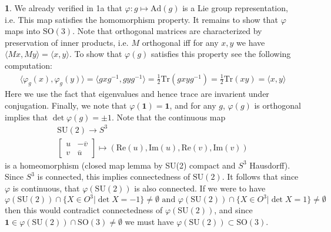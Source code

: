 \documentclass[10.5pt]{article}
\theoremstyle{definition}
\newtheorem{pb}{}
\newcommand{\set}[1]{\{#1\}}
\newcommand{\gen}[1]{\langle #1 \rangle}
\newcommand{\tand}{\text{ and }}
\begin{document}
\begin{pb}
        We already verified in 1a that \(\varphi: g \mapsto \text{Ad}(g)\) is a Lie group representation, i.e. This map satisfies the homomorphism property. It remains to show that
        \(\varphi\) maps into \(\text{SO}(3)\). Note that orthogonal matrices are characterized by preservation of inner products, i.e. \(M\) orthogonal iff for any \(x,y\) we have
        \(\gen{Mx,My} = \gen{x,y}\). To show that \(\varphi(g)\) satisfies this property see the following computation:
        \begin{align*}
            \gen{\varphi_g(x),\varphi_g(y)} = \gen{gxg^{-1},gyg^{-1}} = \frac{1}{2}\text{Tr}(gxyg^{-1}) = \frac{1}{2}\text{Tr}(xy) = \gen{x,y}
        \end{align*}
        Here we use the fact that eigenvalues and hence trace are invarient under conjugation. Finally, we note that \(\varphi(\mathbf{1}) = \mathbf{1}\), and for any \(g\),
        \(\varphi(g)\) is orthogonal implies that \(\det \varphi(g) = \pm 1\). Note that the continuous map
        \begin{align*}
            \text{SU}(2) \to S^3 \\
            \begin{bmatrix} u & -\overline{v} \\ v & \overline{u} \end{bmatrix} \mapsto (\text{Re}(u),\text{Im}(u),\text{Re}(v),\text{Im}(v))
        \end{align*}
        is a homeomorphism (closed map lemma by SU(2) compact and \(S^3\) Hausdorff). Since \(S^3\) is connected, this implies connectedness of \(\text{SU}(2)\).
        It follows that since \(\varphi\) is continuous, that \(\varphi(\text{SU}(2))\) is also connected. If we were to have
        \[\varphi(\text{SU}(2)) \cap \set{X \in O^3 \vert \det X = -1} \neq \emptyset \tand \varphi(\text{SU}(2)) \cap \set{X \in O^3 \vert \det X = 1} \neq \emptyset\]
        then this would contradict connectedness of \(\varphi(\text{SU}(2))\), and since \(\mathbf{1} \in \varphi(\text{SU}(2)) \cap \text{SO}(3) \neq \emptyset\) we must have
        \(\varphi(\text{SU}(2)) \subset \text{SO}(3)\).


\end{pb}
\end{document}

